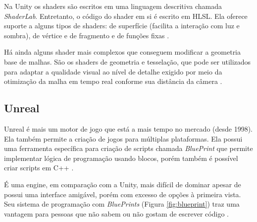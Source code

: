 Na Unity os shaders são escritos em uma linguagem descritiva chamada \textit{ShaderLab}. Entretanto, o código do shader em si é escrito em HLSL. Ela oferece suporte a alguns tipos de shaders: de superfície (facilita a interação com luz e sombra), de vértice e de fragmento e de funções fixas \cite{aino2020}.

Há ainda alguns shader mais complexos que conseguem modificar a geometria base de malhas. São os shaders de geometria e tesselação, que pode ser utilizados para adaptar a qualidade visual ao nível de detalhe exigido por meio da otimização da malha em tempo real conforme sua distância da câmera \cite{aino2020}.

\subsection{Unreal}
\label{sec:unreal}

Unreal é mais um motor de jogo que está a mais tempo no mercado (desde 1998). Ela também permite a criação de jogos para múltiplas plataformas. Ela possui uma ferramenta específica para criação de scripts chamada \textit{BluePrint} que permite implementar lógica de programação usando blocos, porém também é possível criar scripts em C++ \cite{compStudyGE}.

\begin{figure}[h!]
	\centering
\end{figure}
\nocite{blueprint}

É uma engine, em comparação com a Unity, mais difícil de dominar apesar de possui uma interface amigável, porém com excesso de opções à primeira vista. Seu sistema de programação com \textit{BluePrints} (Figura \ref{fig:blueprint}) traz uma vantagem para pessoas que não sabem ou não gostam de escrever código \cite{compStudyGE}.

